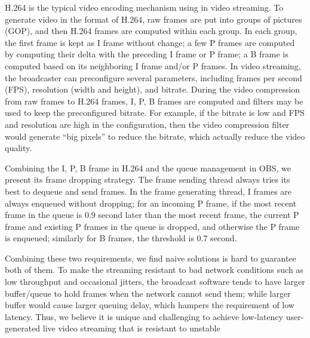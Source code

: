 H.264 is the typical video encoding mechanism using in video streaming. To generate video in the format of H.264, raw frames are put into groups of pictures (GOP), and then H.264 frames are computed within each group. In each group, the first frame is kept as I frame without change; a few P frames are computed by computing their delta with the preceding I frame or P frame; a B frame is computed based on its neighboring I frame and/or P frames. In video streaming, the broadcaster can preconfigure several parameters, including frames per second (FPS), resolution (width and height), and bitrate. During the video compression from raw frames to H.264 frames, I, P, B frames are computed and filters may be used to keep the preconfigured bitrate. For example, if the bitrate is low and FPS and resolution are high in the configuration, then the video compression filter would generate ``big pixels'' to reduce the bitrate, which actually reduce the video quality.

Combining the I, P, B frame in H.264 and the queue management in OBS, we present its frame dropping strategy. The frame sending thread always tries its best to dequeue and send frames. In the frame generating thread, I frames are always enqueued without dropping; for an incoming P frame, if the most recent frame in the queue is 0.9 second later than the most recent frame, the current P frame and existing P frames in the queue is dropped, and otherwise the P frame is enqueued; similarly for B frames, the threshold is 0.7 second.


Combining these two requirements, we find naive solutions is hard to guarantee both of them. To make the streaming resistant to bad network conditions such as low throughput and occasional jitters, the broadcast software tends to have larger buffer/queue to hold frames when the network cannot send them; while larger buffer would cause larger queuing delay, which hampers the requirement of low latency. Thus, we believe it is unique and challenging to achieve low-latency user-generated live video streaming that is resistant to unstable

\fi

\iffalse
\subsection{Commercial Applications}
To validate whether the commercial service provider has solved the issue, we repeat the same black box experiment on two commercial platforms(Twitch, Douyu) and three streamer(OBS, Douyu Tools, XSplit) respectively.
\fi
